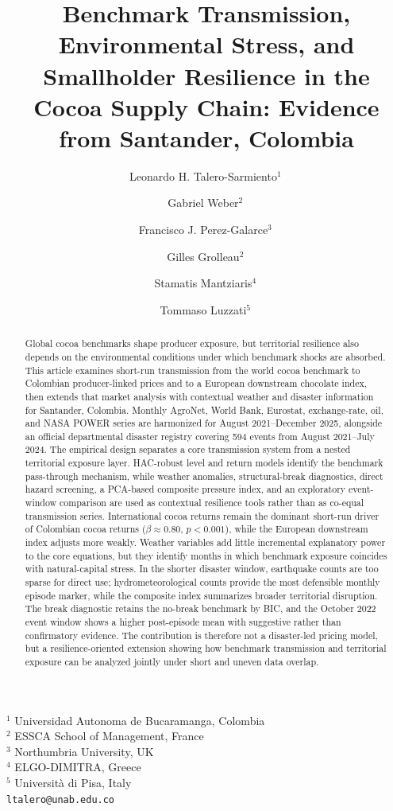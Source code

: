 \documentclass[11pt]{article}
\title{Benchmark Transmission, Environmental Stress, and Smallholder Resilience in the Cocoa Supply Chain: Evidence from Santander, Colombia}
\author{
Leonardo H. Talero-Sarmiento$^{1}$\,\orcidlink{0000-0002-4129-9163} \and
Gabriel Weber$^{2}$\,\orcidlink{0000-0003-2120-1648} \and
Francisco J. Perez-Galarce$^{3}$\,\orcidlink{0000-0002-6921-298X} \and
Gilles Grolleau$^{2}$\,\orcidlink{} \and
Stamatis Mantziaris$^{4}$\,\orcidlink{0000-0001-7047-1447} \and
Tommaso Luzzati$^{5}$\,\orcidlink{}
}
\date{}
\begin{document}
\maketitle
\begin{center}
\small
$^{1}$ Universidad Autonoma de Bucaramanga, Colombia \\
$^{2}$ ESSCA School of Management, France \\
$^{3}$ Northumbria University, UK \\
$^{4}$ ELGO-DIMITRA, Greece \\
$^{5}$ Università di Pisa, Italy \\

\texttt{ltalero@unab.edu.co}
\end{center}
\color{blue}
\begin{abstract}
Global cocoa benchmarks shape producer exposure, but territorial resilience also depends on the environmental conditions under which benchmark shocks are absorbed. This article examines short-run transmission from the world cocoa benchmark to Colombian producer-linked prices and to a European downstream chocolate index, then extends that market analysis with contextual weather and disaster information for Santander, Colombia. Monthly AgroNet, World Bank, Eurostat, exchange-rate, oil, and NASA POWER series are harmonized for August 2021--December 2025, alongside an official departmental disaster registry covering 594 events from August 2021--July 2024. The empirical design separates a core transmission system from a nested territorial exposure layer. HAC-robust level and return models identify the benchmark pass-through mechanism, while weather anomalies, structural-break diagnostics, direct hazard screening, a PCA-based composite pressure index, and an exploratory event-window comparison are used as contextual resilience tools rather than as co-equal transmission series. International cocoa returns remain the dominant short-run driver of Colombian cocoa returns ($\beta \approx 0.80$, $p<0.001$), while the European downstream index adjusts more weakly. Weather variables add little incremental explanatory power to the core equations, but they identify months in which benchmark exposure coincides with natural-capital stress. In the shorter disaster window, earthquake counts are too sparse for direct use; hydrometeorological counts provide the most defensible monthly episode marker, while the composite index summarizes broader territorial disruption. The break diagnostic retains the no-break benchmark by BIC, and the October 2022 event window shows a higher post-episode mean with suggestive rather than confirmatory evidence. The contribution is therefore not a disaster-led pricing model, but a resilience-oriented extension showing how benchmark transmission and territorial exposure can be analyzed jointly under short and uneven data overlap.
\end{abstract}
\end{document}
